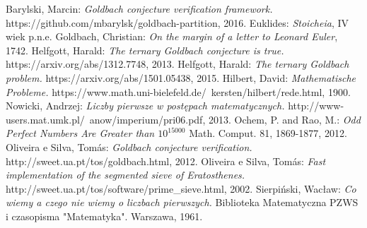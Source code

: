 \documentclass[10pt,onecolumn]{article}
\theoremstyle{definition}
\theoremstyle{hypothesis}
\theoremstyle{capability}
\begin{document}
\newpage


\begin{thebibliography}{9}

  Barylski, Marcin:
  \emph{Goldbach conjecture verification framework.}
  https://github.com/mbarylsk/goldbach-partition,
  2016.
  Euklides:
  \emph{Stoicheia},
  IV wiek p.n.e.
  Goldbach, Christian:
  \emph{On the margin of a letter to Leonard Euler},
  1742.
   Helfgott, Harald:
  \emph{The ternary Goldbach conjecture is true.}
  https://arxiv.org/abs/1312.7748,
  2013.
   Helfgott, Harald:
  \emph{The ternary Goldbach problem.}
  https://arxiv.org/abs/1501.05438,
  2015.
   Hilbert, David:
  \emph{Mathematische Probleme.}
  https://www.math.uni-bielefeld.de/~kersten/hilbert/rede.html,
  1900.
   Nowicki, Andrzej:
  \emph{Liczby pierwsze w postępach matematycznych.}
  http://www-users.mat.umk.pl/~anow/imperium/pri06.pdf,
  2013.
  Ochem, P. and Rao, M.:
  \emph{Odd Perfect Numbers Are Greater than $10^{15000}$}
   Math. Comput. 81, 1869-1877,
   2012.
   Oliveira e Silva, Tomás:
  \emph{Goldbach conjecture verification.}
  http://sweet.ua.pt/tos/goldbach.html,
  2012.
  Oliveira e Silva, Tomás:
  \emph{Fast implementation of the segmented sieve of Eratosthenes.}
  http://sweet.ua.pt/tos/software/prime\_sieve.html,
  2002.
  Sierpiński, Wacław: 
  \emph{Co wiemy a czego nie wiemy o liczbach pierwszych.}
  Biblioteka Matematyczna PZWS i czasopisma "Matematyka". Warszawa, 1961.

\end{thebibliography}
\end{document}
